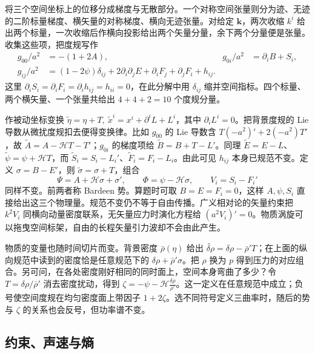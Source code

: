 将三个空间坐标上的位移分成梯度与无散部分。一个对称空间张量则分为迹、无迹的二阶标量梯度、横矢量的对称梯度、横向无迹张量。对给定 $\bm k$，两次收缩 $k^i$ 给出两个标量，一次收缩后作横向投影给出两个矢量分量，余下两个分量便是张量。收集这些项，把度规写作
\begin{align}
 g_{00}/a^2&=-(1+2A),&g_{0i}/a^2&=\partial_i B+S_i,\nonumber\\
 g_{ij}/a^2&=(1-2\psi)\delta_{ij}+2\partial_i\partial_j E
 +\partial_i F_j+\partial_j F_i+h_{ij}. \label{eq:gw-d-svt}
\end{align}
这里 $\partial_iS_i=\partial_i F_i=\partial_i h_{ij}=h_{ii}=0$，在此分解中用 $\delta_{ij}$ 缩并空间指标。四个标量、两个横矢量、一个张量共给出 $4+4+2=10$ 个度规分量。

作被动坐标变换 $\widetilde\eta=\eta+T,\ \widetilde x^i=x^i+\partial^iL+L^i$，其中 $\partial_iL^i=0$。把背景度规的 Lie 导数从微扰度规扣去便得变换律。比如 $g_{00}$ 的 Lie 导数含 $T(-a^2)'+2(-a^2)T'$，故 $\widetilde A=A-\mathcal H T-T'$；$g_{0i}$ 的梯度项给 $\widetilde B=B+T-L'$。同理 $\widetilde E=E-L$、$\widetilde\psi=\psi+\mathcal H T$，而 $\widetilde S_i=S_i-L_i'$、$\widetilde F_i=F_i-L_i$。由此可见 $h_{ij}$ 本身已规范不变。定义 $\sigma=B-E'$，则 $\widetilde\sigma=\sigma+T$，组合
\begin{equation}\label{eq:gw-d-bardeen}
 \Psi=A+\mathcal H\sigma+\sigma',\qquad
 \Phi=\psi-\mathcal H\sigma,\qquad V_i=S_i-F_i'
\end{equation}
同样不变。前两者称 Bardeen 势。算题时可取 $B=E=F_i=0$，这样 $A,\psi,S_i$ 直接给出这三个物理量。规范不变仍不等于自由传播。广义相对论的矢量约束把 $k^2 V_i$ 同横向动量密度联系，无矢量应力时演化方程给 $(a^2V_i)'=0$。物质涡旋可以拖曳空间标架，自由的长程矢量引力波却不会由此产生。

物质的变量也随时间切片而变。背景密度 $\bar\rho(\eta)$ 给出 $\widetilde{\delta\rho}=\delta\rho-\bar\rho' T$；在上面的纵向规范中读到的密度恰是任意规范下的 $\delta\rho+\bar\rho'\sigma$。把 $\rho$ 换为 $p$ 得到压力的对应组合。另可问，在各处密度刚好相同的同时面上，空间本身弯曲了多少？令 $T=\delta\rho/\bar\rho'$ 消去密度扰动，得到 $\zeta=-\psi-\mathcal H\frac{\delta\rho}{\bar\rho'}$。这一定义在任意规范中成立；负号使空间度规在均匀密度面上带因子 $1+2\zeta$。选不同符号定义三曲率时，随后的势与 $\zeta$ 的关系也会反号，但功率谱不变。

\subsection{约束、声速与熵}

